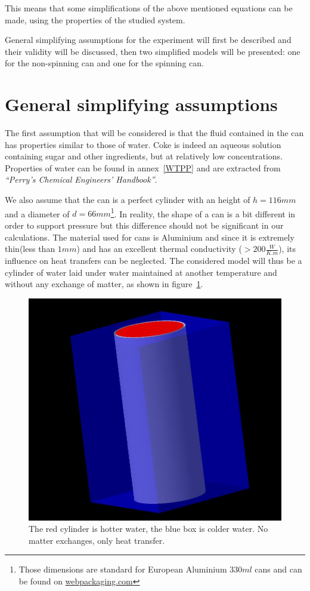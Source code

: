 \documentclass{report}
\begin{document}
	This means that some simplifications of the above mentioned equations can be made, using the properties of the studied system.
	
	General simplifying assumptions for the experiment will first be described and their validity will be discussed, then two simplified models will be presented: one for the non-spinning can and one for the spinning can.
	
	\section{General simplifying assumptions}\label{gsa}
	
	The first assumption that will be considered is that the fluid contained in the can has properties similar to those of water. Coke is indeed an aqueous solution containing sugar and other ingredients, but at relatively low concentrations.
	Properties of water can be found in annex~\ref{WTPP} and are extracted from \emph{``Perry’s Chemical Engineers’ Handbook''\cite{properties}}.
	
	We also assume that the can is a perfect cylinder with an height of $h=116mm$ and a diameter of $d=66mm$\footnote{Those dimensions are standard for European Aluminium $330ml$ cans and can be found on \hyperref{http://www.webpackaging.com/en/portals/rexam/assets/11059498/spec-alu-202/}{}{}{webpackaging.com}}. In reality, the shape of a can is a bit different in order to support pressure but this difference should not be significant in our calculations. The material used for cans is Aluminium and since it is extremely thin(less than $1mm$) and has an excellent thermal conductivity ($>200\frac{W}{K.m}$), its influence on heat transfers can be neglected. The considered model will thus be a cylinder of water laid under water maintained at another temperature and without any exchange of matter, as shown in figure~\ref{cyl}.
	
	\begin{figure}
		\centering
		\includegraphics[width=.5\textwidth]{img/cyl.jpg}
		\caption{The red cylinder is hotter water, the blue box is colder water. No matter exchanges, only heat transfer.}
		\label{cyl}
	\end{figure}
	
\end{document}

